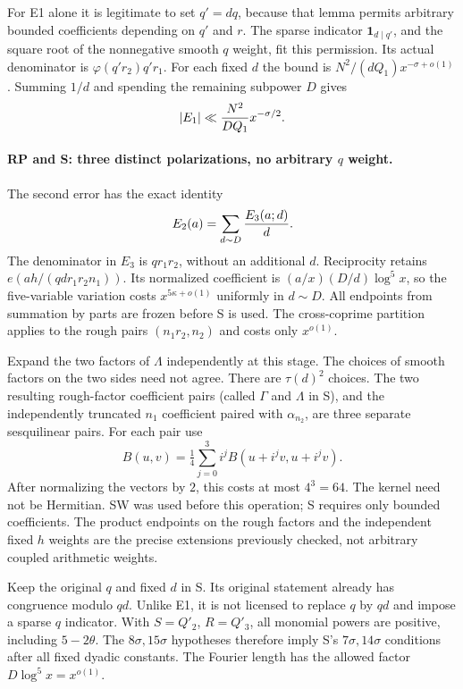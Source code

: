 For E1 alone it is legitimate to set $q'=dq$, because that lemma
permits arbitrary bounded coefficients depending on $q'$ and $r$.
The sparse indicator $\mathbf1_{d\mid q'}$, and the square root of
the nonnegative smooth $q$ weight, fit this permission.  Its actual
denominator is $\varphi(q'r_2)q'r_1$.  For each fixed $d$ the bound
is $N^2/(dQ_1)x^{-\sigma+o(1)}$.  Summing $1/d$ and spending the
remaining subpower $D$ gives
\begin{equation}\label{eq:restricted-E1}
 |E_1|\ll {N^2\over DQ_1}x^{-\sigma/2}.
\end{equation}

\paragraph{RP and S: three distinct polarizations, no arbitrary $q$ weight.}
The second error has the exact identity
\[
 E_2(a)=\sum_{d\sim D}{E_3(a;d)\over d}.
\]
The denominator in $E_3$ is $qr_1r_2$, without an additional $d$.
Reciprocity retains $e(ah/(qdr_1r_2n_1))$.  Its normalized coefficient
is $(a/x)(D/d)\log^5x$, so the five-variable variation costs
$x^{5\kappa+o(1)}$ uniformly in $d\sim D$.
All endpoints from summation by parts are frozen before S is used.
The cross-coprime partition applies to the rough pairs
$(n_1r_2,n_2)$ and costs only $x^{o(1)}$.

Expand the two factors of $\Lambda$ independently at this stage.
The choices of smooth factors on the two sides need not agree.
There are $\tau(d)^2$ choices.  The two resulting rough-factor
coefficient pairs (called $\Gamma$ and $\Lambda$ in S), and the
independently truncated $n_1$ coefficient paired with $\alpha_{n_2}$,
are three separate sesquilinear pairs.  For each pair use
\[
 B(u,v)=\tfrac14\sum_{j=0}^3i^jB(u+i^jv,u+i^jv).
\]
After normalizing the vectors by $2$, this costs at most $4^3=64$.
The kernel need not be Hermitian.  SW was used before this operation;
S requires only bounded coefficients.  The product endpoints on
the rough factors and the independent fixed $h$ weights are the
precise extensions previously checked, not arbitrary coupled
arithmetic weights.

Keep the original $q$ and fixed $d$ in S.  Its original statement
already has congruence modulo $qd$.  Unlike E1, it is not licensed
to replace $q$ by $qd$ and impose a sparse $q$ indicator.
With $S=Q'_2$, $R=Q'_3$, all monomial powers are positive, including
$5-2\theta$.  The $8\sigma,15\sigma$ hypotheses therefore imply
S's $7\sigma,14\sigma$ conditions after all fixed dyadic constants.
The Fourier length has the allowed factor $D\log^5x=x^{o(1)}$.

